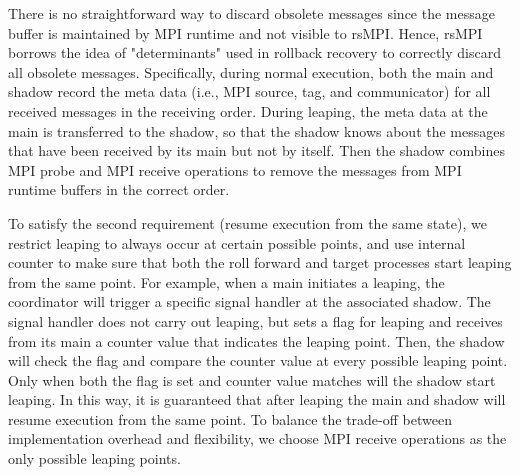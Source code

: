 There is no straightforward way to discard obsolete messages since the message buffer is maintained by MPI runtime and not visible to rsMPI. Hence, rsMPI borrows the idea of "determinants" used in rollback recovery to correctly discard all obsolete messages. Specifically, during normal execution, both the main and shadow record the meta data (i.e., MPI source, tag, and communicator) for all received messages in the receiving order. During leaping, the meta data at the main is transferred to the shadow, so that the shadow knows about the messages that have been received by its main but not by itself. Then the shadow combines MPI probe and MPI receive operations to remove the messages from MPI runtime buffers in the correct order.

To satisfy the second requirement (resume execution from the same state), we restrict leaping to always occur at certain possible points, and use internal counter to make sure that both the roll forward and target processes start leaping from the same point. For example, when a main initiates a leaping, the coordinator will trigger a specific signal handler at the associated shadow. The signal handler does not carry out leaping, but sets a flag for leaping and receives from its main a counter value that indicates the leaping point. Then, the shadow will check the flag and compare the counter value at every possible leaping point. Only when both the flag is set and counter value matches will the shadow start leaping. In this way, it is guaranteed that after leaping the main and shadow will resume execution from the same point. To balance the trade-off between implementation overhead and  flexibility, we choose MPI receive operations as the only possible leaping points. 

 




